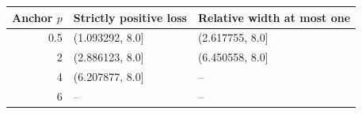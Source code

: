 \begin{tabular}{rll}
\toprule
Anchor $p$ & Strictly positive loss & Relative width at most one \\
\midrule
0.5 & (1.093292, 8.0] & (2.617755, 8.0] \\
2 & (2.886123, 8.0] & (6.450558, 8.0] \\
4 & (6.207877, 8.0] & -- \\
6 & -- & -- \\
\bottomrule
\end{tabular}
